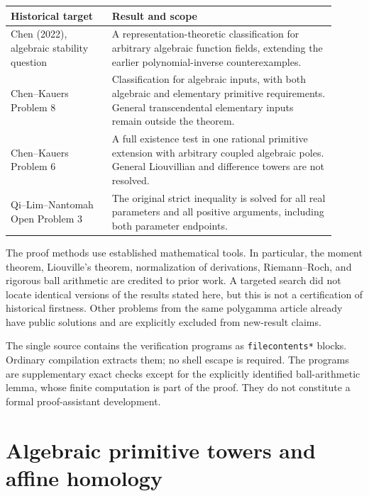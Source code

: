 \begin{center}\small
\begin{tabular}{p{0.29\linewidth}p{0.62\linewidth}}
\toprule
Historical target & Result and scope \\
\midrule
Chen (2022), algebraic stability question &
A representation-theoretic classification for arbitrary algebraic
function fields, extending the earlier polynomial-inverse counterexamples.\\[4pt]
Chen--Kauers Problem 8 &
Classification for algebraic inputs, with both algebraic and elementary
primitive requirements. General transcendental elementary inputs remain
outside the theorem.\\[4pt]
Chen--Kauers Problem 6 &
A full existence test in one rational primitive extension with arbitrary
coupled algebraic poles. General Liouvillian and difference towers are
not resolved.\\[4pt]
Qi--Lim--Nantomah Open Problem 3 &
The original strict inequality is solved for all real parameters and
all positive arguments, including both parameter endpoints.\\
\bottomrule
\end{tabular}
\end{center}

The proof methods use established mathematical tools. In particular,
the moment theorem, Liouville's theorem, normalization of derivations,
Riemann--Roch, and rigorous ball arithmetic are credited to prior work.
A targeted search did not locate identical versions of the results
stated here, but this is not a certification of historical firstness.
Other problems from the same polygamma article already have public
solutions and are explicitly excluded from new-result claims.

The single source contains the verification programs as
\texttt{filecontents*} blocks. Ordinary compilation extracts them;
no shell escape is required. The programs are supplementary exact
checks except for the explicitly identified ball-arithmetic lemma,
whose finite computation is part of the proof. They do not constitute
a formal proof-assistant development.

\tableofcontents
\clearpage
\section{Algebraic primitive towers and affine homology}

